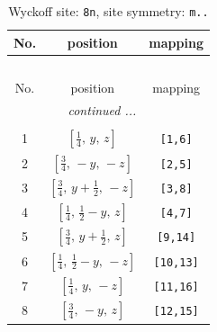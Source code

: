 \documentclass[fleqn,8pt]{jsarticle}
\begin{document}
\begin{longtable}{ccc}
\caption{Wyckoff site: {\tt 8n}, site symmetry: {\tt m..}}
 \\
 \hline \hline
No. & position & mapping \\ \hline \endfirsthead

\multicolumn{2}{l}{\tablename\ \thetable{}} \\
 \hline \hline
No. & position & mapping \\ \hline \endhead

 \hline \hline
\multicolumn{2}{r}{\footnotesize\it continued ...} \\ \endfoot

 \hline \hline
\multicolumn{2}{r}{} \\ \endlastfoot

1 & $\left[ \frac{1}{4},\, y,\, z \right]$ & {\tt [1,6]} \\ \hline
2 & $\left[ \frac{3}{4},\, - y,\, - z \right]$ & {\tt [2,5]} \\ \hline
3 & $\left[ \frac{3}{4},\, y + \frac{1}{2},\, - z \right]$ & {\tt [3,8]} \\ \hline
4 & $\left[ \frac{1}{4},\, \frac{1}{2} - y,\, z \right]$ & {\tt [4,7]} \\ \hline
5 & $\left[ \frac{3}{4},\, y + \frac{1}{2},\, z \right]$ & {\tt [9,14]} \\ \hline
6 & $\left[ \frac{1}{4},\, \frac{1}{2} - y,\, - z \right]$ & {\tt [10,13]} \\ \hline
7 & $\left[ \frac{1}{4},\, y,\, - z \right]$ & {\tt [11,16]} \\ \hline
8 & $\left[ \frac{3}{4},\, - y,\, z \right]$ & {\tt [12,15]} \\
\end{longtable}
\renewcommand{\arraystretch}{1.2}
\end{document}
